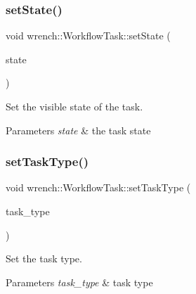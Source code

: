 \subsubsection{\texorpdfstring{set\+State()}{setState()}}
{\footnotesize\ttfamily void wrench\+::\+Workflow\+Task\+::set\+State (\begin{DoxyParamCaption}\item[{\hyperlink{classwrench_1_1_workflow_task_a1184f3d7aea21e1c87a9b17e84f1f92a}{Workflow\+Task\+::\+State}}]{state }\end{DoxyParamCaption})}



Set the visible state of the task. 


\begin{DoxyParams}{Parameters}
{\em state} & the task state \\
\hline
\end{DoxyParams}
\mbox{\label{classwrench_1_1_workflow_task_ab10c4b26c9f669dd39c9bf76b597abf9}} 
\subsubsection{\texorpdfstring{set\+Task\+Type()}{setTaskType()}}
{\footnotesize\ttfamily void wrench\+::\+Workflow\+Task\+::set\+Task\+Type (\begin{DoxyParamCaption}\item[{\hyperlink{classwrench_1_1_workflow_task_a490a935259b9425a3e4fb011a86cb4bf}{Task\+Type}}]{task\+\_\+type }\end{DoxyParamCaption})}



Set the task type. 


\begin{DoxyParams}{Parameters}
{\em task\+\_\+type} & task type \\
\hline
\end{DoxyParams}
\mbox{\label{classwrench_1_1_workflow_task_ae3ef50f03b899d787a4514ff5e3dda9f}} 
